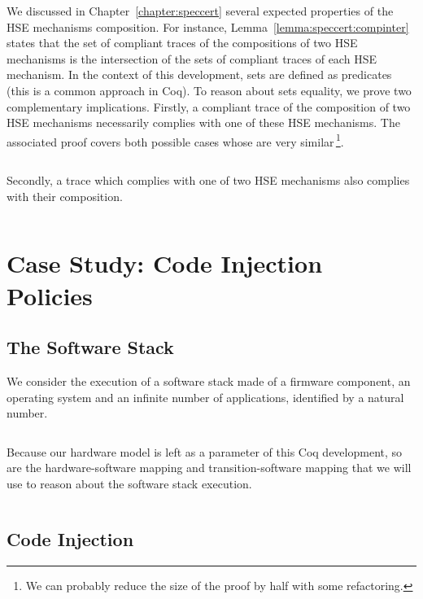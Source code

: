 \inputminted[gobble=2,firstline=424,lastline=428]{coq}{Listings/SpecCert.v}

We discussed in Chapter~\ref{chapter:speccert} several expected properties of
the HSE mechanisms composition.
%
For instance, Lemma~\ref{lemma:speccert:compinter} states that the set of
compliant traces of the compositions of two HSE mechanisms is the intersection
of the sets of compliant traces of each HSE mechanism.
%
In the context of this development, sets are defined as predicates (this is a
common approach in Coq).
%
To reason about sets equality, we prove two complementary implications.
%
Firstly, a compliant trace of the composition of two HSE mechanisms necessarily
complies with one of these HSE mechanisms.
%
The associated proof covers both possible cases whose are very
similar\,\footnote{We can probably reduce the size of the proof by half with
  some refactoring.}.

\inputminted[gobble=2,firstline=472,lastline=512]{coq}{Listings/SpecCert.v}

Secondly, a trace which complies with one of two HSE mechanisms also complies
with their composition.

\inputminted[gobble=2,firstline=514,lastline=537]{coq}{Listings/SpecCert.v}

\section{Case Study: Code Injection Policies}

\subsection{The Software Stack}

We consider the execution of a software stack made of a firmware component, an
operating system and an infinite number of applications, identified by a natural
number.

\inputminted[gobble=2,firstline=262,lastline=269]{coq}{Listings/SpecCert.v}

Because our hardware model is left as a parameter of this Coq development, so
are the hardware-software mapping and transition-software mapping that we will
use to reason about the software stack execution.

\inputminted[gobble=2,firstline=271,lastline=272]{coq}{Listings/SpecCert.v}

\subsection{Code Injection}

